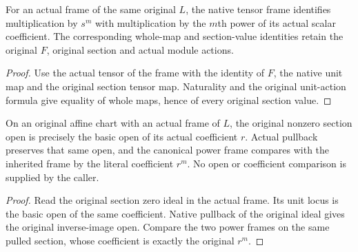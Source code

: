 \begin{lemma}
\label{lem:cech-line-section-original-tensor-values}
\leanok
For an actual frame of the same original $L$, the native tensor frame identifies multiplication by $s^m$ with multiplication by the $m$th power of its actual scalar coefficient. The corresponding whole-map and section-value identities retain the original $F$, original section and actual module actions.
\end{lemma}
\begin{proof}
Use the actual tensor of the frame with the identity of $F$, the native unit map and the original section tensor map. Naturality and the original unit-action formula give equality of whole maps, hence of every original section value.
\end{proof}

\begin{lemma}
\label{lem:cech-line-section-original-affine-open}
\leanok
On an original affine chart with an actual frame of $L$, the original nonzero section open is precisely the basic open of its actual coefficient $r$. Actual pullback preserves that same open, and the canonical power frame compares with the inherited frame by the literal coefficient $r^m$. No open or coefficient comparison is supplied by the caller.
\end{lemma}
\begin{proof}
Read the original section zero ideal in the actual frame. Its unit locus is the basic open of the same coefficient. Native pullback of the original ideal gives the original inverse-image open. Compare the two power frames on the same pulled section, whose coefficient is exactly the original $r^m$.
\end{proof}

